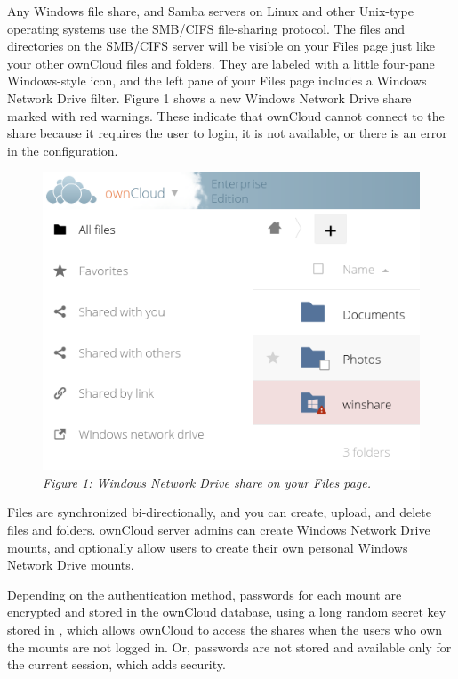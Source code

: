 \documentclass[letterpaper,10pt,english]{sphinxmanual}
\begin{document}
Any Windows file share, and Samba servers on Linux and other Unix-type operating
systems use the SMB/CIFS file-sharing protocol. The files and directories on the
SMB/CIFS server will be visible on your Files page just like your other ownCloud
files and folders. They are labeled with a little four-pane Windows-style icon,
and the left pane of your Files page includes a Windows Network Drive filter.
Figure 1 shows a new Windows Network Drive share marked with red warnings.
These indicate that ownCloud cannot connect to the share because it requires
the user to login, it is not available, or there is an error in the
configuration.
\begin{figure}[htbp]
\centering
\capstart

\includegraphics{wnd-1.png}
\caption{\emph{Figure 1: Windows Network Drive share on your Files page.}}\end{figure}

Files are synchronized bi-directionally, and you can create, upload, and delete
files and folders. ownCloud server admins can create Windows Network Drive
mounts, and optionally allow users to create their own personal Windows Network
Drive mounts.

Depending on the authentication method, passwords for each mount are encrypted
and stored in the ownCloud database, using a long random secret key stored in
, which allows ownCloud to access the shares when the users who
own the mounts are not logged in. Or, passwords are not stored and available
only for the current session, which adds security.
\end{document}
